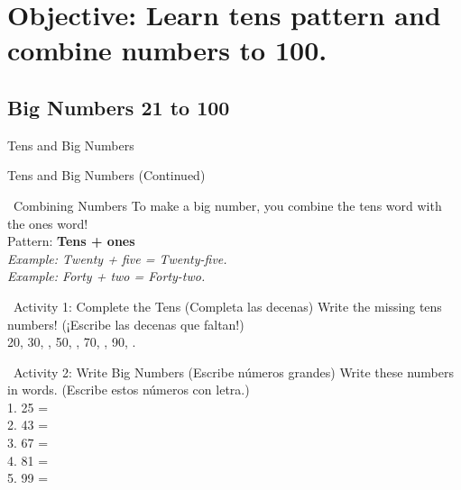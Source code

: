 \section*{Objective: Learn tens pattern and combine numbers to 100.}

\subsection*{Big Numbers 21 to 100}

\begin{vocabcard}{Tens and Big Numbers}
\end{vocabcard}

\newpage

\begin{vocabcard}{Tens and Big Numbers (Continued)}
\end{vocabcard}

\begin{grammartip}{ \ Combining Numbers}
  To make a big number, you combine the tens word with the ones word!\\
  Pattern: \textbf{Tens + ones}\\
  \emph{Example: Twenty + five = Twenty-five.}\\
  \emph{Example: Forty + two = Forty-two.}
\end{grammartip}

\begin{activity}{ \ Activity 1: Complete the Tens (Completa las decenas)}
  Write the missing tens numbers! (¡Escribe las decenas que faltan!)\\[1em]
  20, 30, \answerline[2cm], 50, \answerline[2cm], 70, \answerline[2cm], 90, \answerline[2cm].
\end{activity}

\begin{activity}{ \ Activity 2: Write Big Numbers (Escribe números grandes)}
  Write these numbers in words. (Escribe estos números con letra.)\\[1em]
  1. 25 = \answerline[5cm]\\
  2. 43 = \answerline[5cm]\\
  3. 67 = \answerline[5cm]\\
  4. 81 = \answerline[5cm]\\
  5. 99 = \answerline[5cm]
\end{activity}

